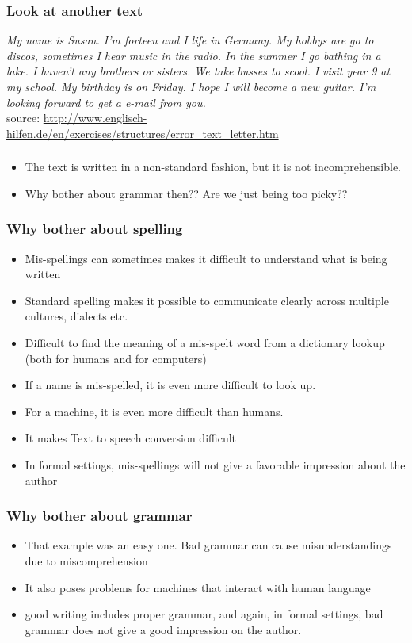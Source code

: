 \documentclass{beamer}
\begin{document}
\begin{frame}
\frametitle{Look at another text} \small
\textit{My name is Susan. I'm forteen and I life in Germany. My hobbys are go to discos, sometimes I hear music in the radio. In the summer I go bathing in a lake. I haven't any brothers or sisters. We take busses to scool. I visit year 9 at my school. My birthday is on Friday. I hope I will become a new guitar.
I'm looking forward to get a e-mail from you.}
\\ source: \url{http://www.englisch-hilfen.de/en/exercises/structures/error_text_letter.htm}
\end{frame}

\begin{frame}
\frametitle{}
\begin{itemize}
\item The text is written in a non-standard fashion, but it is not incomprehensible.
\item Why bother about grammar then?? Are we just being too picky??
\end{itemize}
\end{frame}

\begin{frame}
\frametitle{Why bother about spelling}
\begin{itemize}
\item Mis-spellings can sometimes makes it difficult to understand what is being written
\item Standard spelling makes it possible to communicate clearly across multiple cultures, dialects etc.
\item Difficult to find the meaning of a mis-spelt word from a dictionary lookup (both for humans and for computers)
\item If a name is mis-spelled, it is even more difficult to look up. 
\item For a machine, it is even more difficult than humans.
\item It makes Text to speech conversion difficult
\item In formal settings, mis-spellings will not give a favorable impression about the author
\end{itemize}
\end{frame}

\begin{frame}
\frametitle{Why bother about grammar}
\begin{itemize}
\item That example was an easy one. Bad grammar can cause misunderstandings due to miscomprehension
\item It also poses problems for machines that interact with human language
\item good writing includes proper grammar, and again, in formal settings, bad grammar does not give a good impression on the author.
\end{itemize}
\end{frame}
\end{document}
